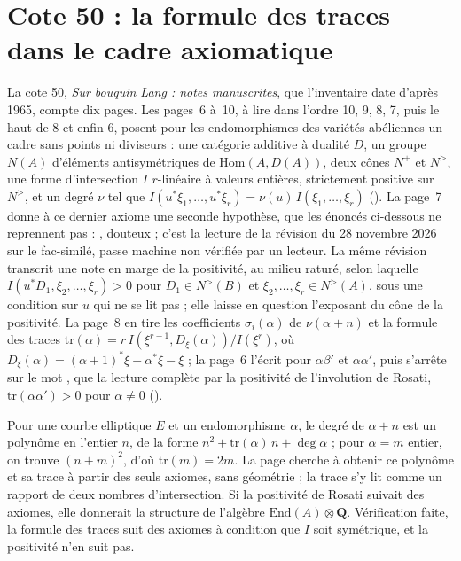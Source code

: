 \section[Cote 50 : la formule des traces dans le cadre axiomatique]{Cote 50 : la formule des traces dans le cadre axiomatique\protect{}}\label{sec:50}

La cote 50, \emph{Sur bouquin Lang : notes manuscrites}, que l'inventaire date d'après 1965, compte dix pages. Les pages~6 à~10, à lire dans l'ordre 10, 9, 8, 7, puis le haut de 8 et enfin 6, posent pour les endomorphismes des variétés abéliennes un cadre sans points ni diviseurs : une catégorie additive à dualité $D$, un groupe $N(A)$ d'éléments antisymétriques de $\mathrm{Hom}(A, D(A))$, deux cônes $N^+$ et $N^>$, une forme d'intersection $I$ $r$-linéaire à valeurs entières, strictement positive sur $N^>$, et un degré $\nu$ tel que $I(u^*\xi_1, \dots, u^*\xi_r) = \nu(u)\, I(\xi_1, \dots, \xi_r)$ (). La page~7 donne à ce dernier axiome une seconde hypothèse, que les énoncés ci-dessous ne reprennent pas : ,  douteux ; c'est la lecture de la révision du 28 novembre 2026 sur le fac-similé, passe machine non vérifiée par un lecteur. La même révision transcrit une note en marge de la positivité, au milieu raturé, selon laquelle $I(u^*D_1, \xi_2, \dots, \xi_r) > 0$ pour $D_1 \in N^>(B)$ et $\xi_2, \dots, \xi_r \in N^>(A)$, sous une condition sur $u$ qui ne se lit pas ; elle laisse en question l'exposant du cône de la positivité. La page~8 en tire les coefficients $\sigma_i(\alpha)$ de $\nu(\alpha + n)$ et la formule des traces $\mathrm{tr}(\alpha) = r\, I(\xi^{r-1}, D_\xi(\alpha))/I(\xi^r)$, où $D_\xi(\alpha) = (\alpha + 1)^*\xi - \alpha^*\xi - \xi$ ; la page~6 l'écrit pour $\alpha\beta'$ et $\alpha\alpha'$, puis s'arrête sur le mot , que la lecture complète par la positivité de l'involution de Rosati, $\mathrm{tr}(\alpha\alpha') > 0$ pour $\alpha \neq 0$ ().

Pour une courbe elliptique $E$ et un endomorphisme $\alpha$, le degré de $\alpha + n$ est un polynôme en l'entier $n$, de la forme $n^2 + \mathrm{tr}(\alpha)\,n + \deg\alpha$ ; pour $\alpha = m$ entier, on trouve $(n + m)^2$, d'où $\mathrm{tr}(m) = 2m$. La page cherche à obtenir ce polynôme et sa trace à partir des seuls axiomes, sans géométrie ; la trace s'y lit comme un rapport de deux nombres d'intersection. Si la positivité de Rosati suivait des axiomes, elle donnerait la structure de l'algèbre $\mathrm{End}(A) \otimes \mathbf Q$. Vérification faite, la formule des traces suit des axiomes à condition que $I$ soit symétrique, et la positivité n'en suit pas.

